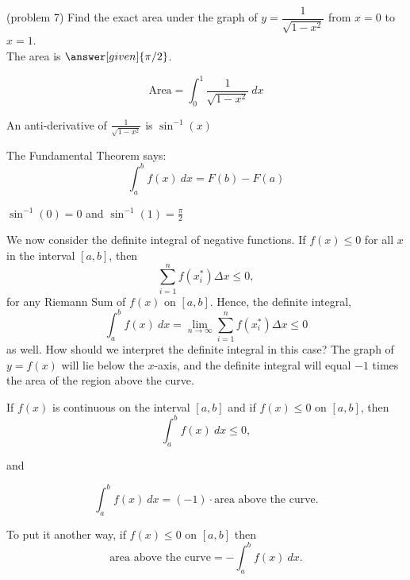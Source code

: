 \documentclass{ximera}
\begin{document}
\begin{problem}(problem 7)
Find the exact area under the graph of $y = \dfrac{1}{\sqrt{1-x^2}}$ from $x = 0$ to $x = 1$.\\
The area is $\answer[given]{\pi/2}$.
 \begin{hint}
  \[
  \text{Area} =  \int_0^1 \frac{1}{\sqrt{1-x^2}} \ dx
  \]
 \end{hint} 
    \begin{hint}
      An anti-derivative of $\frac{1}{\sqrt{1-x^2}}$ is $\sin^{-1}(x)$
    \end{hint}
    
    \begin{hint}
      The Fundamental Theorem says:
      \[
      \int_a^b f(x) \ dx = F(b) - F(a)
      \]
    \end{hint}    
		\begin{hint}
      $\sin^{-1}(0) = 0$ and $\sin^{-1}(1) = \frac{\pi}{2}$ 
    \end{hint}
		
		
\end{problem}


We now consider the definite integral of negative functions.
If $f(x) \leq 0$ for all $x$ in the interval $[a,b]$, then 
\[\sum_{i=1}^n f(x_i^*) \Delta x \leq 0,\]
for any Riemann Sum of $f(x)$ on $[a, b]$.
Hence, the definite integral,
\[
\int_a^b f(x) \ dx = \lim_{n \to \infty} \sum_{i=1}^n f(x_i^*) \Delta x \leq 0
\]
as well. How should we interpret the definite integral in this case? The graph of $y = f(x)$ will lie below the $x$-axis, 
and the definite integral will equal $-1$ times the area of the region above the curve. 

\begin{proposition}
If $f(x)$ is continuous on the interval $[a, b]$ and if $f(x) \leq 0$ on $[a,b]$,
then 
\[ \int_a^b f(x) \ dx \leq 0,\]

and 

\[\int_a^b f(x) \ dx = (-1) \cdot \text{area above the curve}.\]
\end{proposition}

To put it another way, if $f(x) \leq 0$ on $[a,b]$ then
\[\text{area above the curve} = -\int_a^b f(x) \ dx.\]
\end{document}
